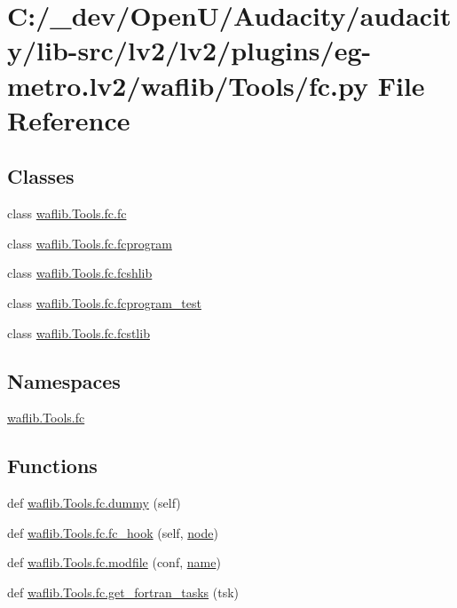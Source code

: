 \hypertarget{lv2_2plugins_2eg-metro_8lv2_2waflib_2_tools_2fc_8py}{}\section{C\+:/\+\_\+dev/\+Open\+U/\+Audacity/audacity/lib-\/src/lv2/lv2/plugins/eg-\/metro.lv2/waflib/\+Tools/fc.py File Reference}
\label{lv2_2plugins_2eg-metro_8lv2_2waflib_2_tools_2fc_8py}
\subsection*{Classes}
\begin{DoxyCompactItemize}
\item 
class \hyperlink{classwaflib_1_1_tools_1_1fc_1_1fc}{waflib.\+Tools.\+fc.\+fc}
\item 
class \hyperlink{classwaflib_1_1_tools_1_1fc_1_1fcprogram}{waflib.\+Tools.\+fc.\+fcprogram}
\item 
class \hyperlink{classwaflib_1_1_tools_1_1fc_1_1fcshlib}{waflib.\+Tools.\+fc.\+fcshlib}
\item 
class \hyperlink{classwaflib_1_1_tools_1_1fc_1_1fcprogram__test}{waflib.\+Tools.\+fc.\+fcprogram\+\_\+test}
\item 
class \hyperlink{classwaflib_1_1_tools_1_1fc_1_1fcstlib}{waflib.\+Tools.\+fc.\+fcstlib}
\end{DoxyCompactItemize}
\subsection*{Namespaces}
\begin{DoxyCompactItemize}
\item 
 \hyperlink{namespacewaflib_1_1_tools_1_1fc}{waflib.\+Tools.\+fc}
\end{DoxyCompactItemize}
\subsection*{Functions}
\begin{DoxyCompactItemize}
\item 
def \hyperlink{namespacewaflib_1_1_tools_1_1fc_a27d355b521fb9e2bf9fa51b4c5b86a75}{waflib.\+Tools.\+fc.\+dummy} (self)
\item 
def \hyperlink{namespacewaflib_1_1_tools_1_1fc_a32c4c535596617f7d93fadd0607f18eb}{waflib.\+Tools.\+fc.\+fc\+\_\+hook} (self, \hyperlink{structnode}{node})
\item 
def \hyperlink{namespacewaflib_1_1_tools_1_1fc_ae8fd3a39f47bdf4cb2e5d16cbdacd4e0}{waflib.\+Tools.\+fc.\+modfile} (conf, \hyperlink{lib_2expat_8h_a1b49b495b59f9e73205b69ad1a2965b0}{name})
\item 
def \hyperlink{namespacewaflib_1_1_tools_1_1fc_a042f42940a7e5040b3d6e9c3dd3df7f4}{waflib.\+Tools.\+fc.\+get\+\_\+fortran\+\_\+tasks} (tsk)
\end{DoxyCompactItemize}

